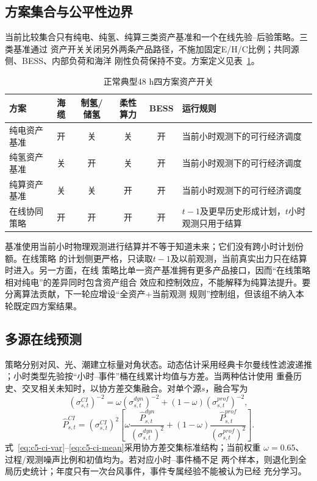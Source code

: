 \subsection{方案集合与公平性边界}

当前比较集合只有纯电、纯氢、纯算三类资产基准和一个在线先验--后验策略。三类基准通过
资产开关关闭另外两条产品路径，不施加固定E/H/C比例；共同源侧、BESS、内部负荷和海洋
刚性负荷保持不变。方案定义见表~\ref{tab:c5-strategy-def}。

\begin{table}[htbp]
\centering
\caption{正常典型48 h四方案资产开关}
\label{tab:c5-strategy-def}
\begin{tabularx}{\textwidth}{p{2.6cm}ccccX}
\toprule
方案 & 海缆 & 制氢/储氢 & 柔性算力 & BESS & 运行规则\\
\midrule
纯电资产基准 & 开 & 关 & 关 & 开 & 当前小时观测下的可行经济调度\\
纯氢资产基准 & 关 & 开 & 关 & 开 & 当前小时观测下的可行经济调度\\
纯算资产基准 & 关 & 关 & 开 & 开 & 当前小时观测下的可行经济调度\\
在线协同策略 & 开 & 开 & 开 & 开 & $t-1$及更早历史形成计划，$t$小时观测只用于结算\\
\bottomrule
\end{tabularx}
\end{table}

基准使用当前小时物理观测进行结算并不等于知道未来；它们没有跨小时计划份额。在线策略
的计划侧更严格，只读取$t-1$及以前观测，当前真实出力只在结算时进入。另一方面，在线
策略比单一资产基准拥有更多产品接口，因而“在线策略相对纯电”的差异同时包含资产组合
效应和控制效应，不能解释为纯算法提升。要分离算法贡献，下一轮应增设“全资产+当前观测
规则”控制组，但该组不纳入本轮既定四方案结果。

\subsection{多源在线预测}

策略分别对风、光、潮建立标量对角状态。动态估计采用经典卡尔曼线性滤波递推
\cite{kalman1960}；小时类型先验按“小时--事件”桶在线累计均值与方差。当两种估计使用
重叠历史、交叉相关未知时，以协方差交集融合\cite{julier1997ci}。对单个源$s$，融合写为
\begin{equation}
\left(\sigma_{s,t}^{CI}\right)^{-2}
=\omega\left(\sigma_{s,t}^{dyn}\right)^{-2}
+(1-\omega)\left(\sigma_{s,t}^{prof}\right)^{-2},
\label{eq:c5-ci-var}
\end{equation}
\begin{equation}
\widehat P_{s,t}^{CI}=\left(\sigma_{s,t}^{CI}\right)^2
\left[
\omega\frac{\widehat P_{s,t}^{dyn}}{(\sigma_{s,t}^{dyn})^2}
+(1-\omega)\frac{\widehat P_{s,t}^{prof}}{(\sigma_{s,t}^{prof})^2}
\right].
\label{eq:c5-ci-mean}
\end{equation}
式~\eqref{eq:c5-ci-var}--\eqref{eq:c5-ci-mean}采用协方差交集标准结构；当前权重
$\omega=0.65$、过程/观测噪声比例和初值均为\assumptiontag。若对应小时--事件桶不足
两个样本，则退化到全局历史统计；年度只有一次台风事件，事件专属经验不能被认为已经
充分学习。

